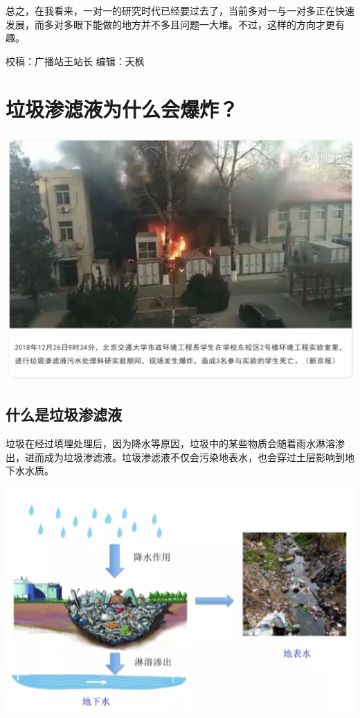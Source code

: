\documentclass[
]{book}
\begin{document}
总之，在我看来，一对一的研究时代已经要过去了，当前多对一与一对多正在快速发展，而多对多眼下能做的地方并不多且问题一大堆。不过，这样的方向才更有趣。

校稿：广播站王站长
编辑：天枫

\hypertarget{ux5783ux573eux6e17ux6ee4ux6db2ux4e3aux4ec0ux4e48ux4f1aux7206ux70b8}{%
\section{垃圾渗滤液为什么会爆炸？}\label{ux5783ux573eux6e17ux6ee4ux6db2ux4e3aux4ec0ux4e48ux4f1aux7206ux70b8}}

\includegraphics[width=6.67in]{images/slybz1}

\hypertarget{ux4ec0ux4e48ux662fux5783ux573eux6e17ux6ee4ux6db2}{%
\subsection{什么是垃圾渗滤液}\label{ux4ec0ux4e48ux662fux5783ux573eux6e17ux6ee4ux6db2}}

垃圾在经过填埋处理后，因为降水等原因，垃圾中的某些物质会随着雨水淋溶渗出，进而成为垃圾渗滤液。垃圾渗滤液不仅会污染地表水，也会穿过土层影响到地下水水质。

\includegraphics[width=6.67in]{images/slybz2}
\end{document}
